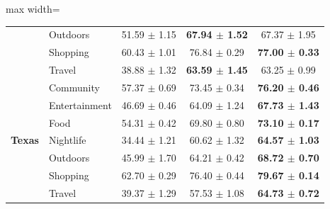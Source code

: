 \begin{table}[htbp]
\begin{adjustbox}{max width=\textwidth}
\begin{tabular}{clccc}
 & Outdoors & 51.59 $\pm$ 1.15 & \textbf{67.94 $\pm$ 1.52} & 67.37 $\pm$ 1.95 \\
 & Shopping & 60.43 $\pm$ 1.01 & 76.84 $\pm$ 0.29 & \textbf{77.00 $\pm$ 0.33} \\
 & Travel & 38.88 $\pm$ 1.32 & \textbf{63.59 $\pm$ 1.45} & 63.25 $\pm$ 0.99 \\
\midrule
\multirow{7}{*}{\textbf{Texas}} & Community & 57.37 $\pm$ 0.69 & 73.45 $\pm$ 0.34 & \textbf{76.20 $\pm$ 0.46} \\
 & Entertainment & 46.69 $\pm$ 0.46 & 64.09 $\pm$ 1.24 & \textbf{67.73 $\pm$ 1.43} \\
 & Food & 54.31 $\pm$ 0.42 & 69.80 $\pm$ 0.80 & \textbf{73.10 $\pm$ 0.17} \\
 & Nightlife & 34.44 $\pm$ 1.21 & 60.62 $\pm$ 1.32 & \textbf{64.57 $\pm$ 1.03} \\
 & Outdoors & 45.99 $\pm$ 1.70 & 64.21 $\pm$ 0.42 & \textbf{68.72 $\pm$ 0.70} \\
 & Shopping & 62.70 $\pm$ 0.29 & 76.40 $\pm$ 0.44 & \textbf{79.67 $\pm$ 0.14} \\
 & Travel & 39.37 $\pm$ 1.29 & 57.53 $\pm$ 1.08 & \textbf{64.73 $\pm$ 0.72} \\
\bottomrule
\end{tabular}
\end{adjustbox}
\end{table}
